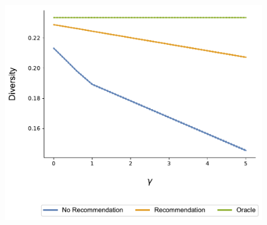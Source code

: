 \documentclass[sigconf]{acmart}
\begin{document}
\begin{figure}[ht]
\includegraphics[width=.9\linewidth]{figures/gamma_diversity_N_200_T_20}
\label{fig:risk_aversion_diversity}
\end{figure}
\end{document}
